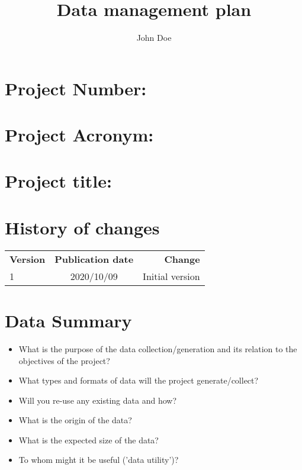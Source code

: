 \documentclass{article}
\title{Data management plan}
\author{John Doe}
\date{}
\begin{document}
\begin{titlepage}
\maketitle
\bigskip
\section*{Project  Number:}
\section*{Project Acronym:}
\section*{Project title:} 
\bigskip
\section*{History of changes}
\begin{tabular}{ l | c | r }
   \textbf{Version} & \textbf{Publication date} & \textbf{Change} \\
   1 & 2020/10/09 & Initial version \\
\end{tabular}
\end{titlepage}

\newpage
\tableofcontents
\newpage

\section{Data Summary}
\begin{itemize}
\item What is the purpose of the data collection/generation and its relation to the objectives of the project?
\item What types and formats of data will the project generate/collect?
\item Will you re-use any existing data and how?
\item What is the origin of the data?
\item What is the expected size of the data?
\item To whom might it be useful ('data utility')?
\end{itemize}
\end{document}
